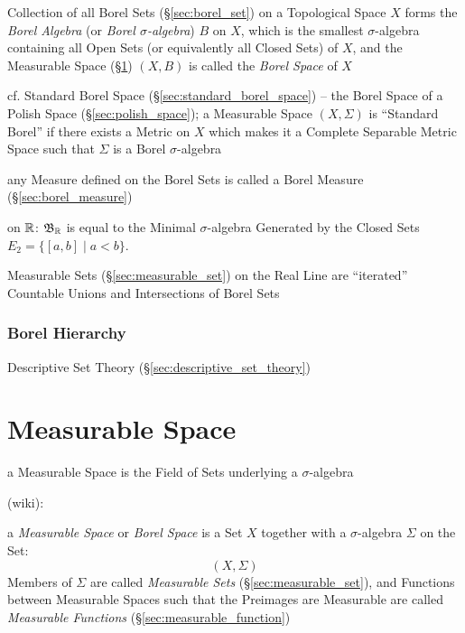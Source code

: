 Collection of all Borel Sets (\S\ref{sec:borel_set}) on a Topological Space $X$
forms the \emph{Borel Algebra} (or \emph{Borel $\sigma$-algebra}) $B$ on $X$,
which is the smallest $\sigma$-algebra containing all Open Sets (or equivalently
all Closed Sets) of $X$, and the Measurable Space (\S\ref{sec:measurable_space})
$(X,B)$ is called the \emph{Borel Space} of $X$

\fist cf. Standard Borel Space (\S\ref{sec:standard_borel_space}) -- the Borel
Space of a Polish Space (\S\ref{sec:polish_space}); a Measurable Space $(X,
\Sigma)$ is ``Standard Borel'' if there exists a Metric on $X$ which makes it a
Complete Separable Metric Space such that $\Sigma$ is a Borel $\sigma$-algebra

any Measure defined on the Borel Sets is called a Borel Measure
(\S\ref{sec:borel_measure})

on $\mathbb{R}$: $\mathfrak{B}_{\mathbb{R}}$ is equal to the Minimal $\sigma$-algebra
Generated by the Closed Sets $E_2 = \{ [a,b] \;|\; a < b \}$.

Measurable Sets (\S\ref{sec:measurable_set}) on the Real Line are ``iterated''
Countable Unions and Intersections of Borel Sets



\subsubsection{Borel Hierarchy}\label{sec:borel_hierarchy}\hfill

\fist Descriptive Set Theory (\S\ref{sec:descriptive_set_theory})



\section{Measurable Space}\label{sec:measurable_space}

a Measurable Space is the Field of Sets underlying a $\sigma$-algebra

(wiki):

a \emph{Measurable Space} or \emph{Borel Space} is a Set $X$ together with a
$\sigma$-algebra $\Sigma$ on the Set:
\[
  (X,\Sigma)
\]
Members of $\Sigma$ are called \emph{Measurable Sets}
(\S\ref{sec:measurable_set}), and Functions between Measurable Spaces such that
the Preimages are Measurable are called \emph{Measurable Functions}
(\S\ref{sec:measurable_function})


